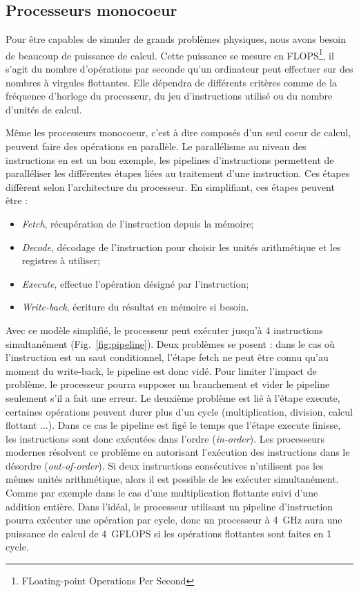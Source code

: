 \subsection{Processeurs monocoeur}
Pour être capables de simuler de grands problèmes physiques, nous avons besoin de beaucoup de puissance de calcul.
%
Cette puissance se mesure en FLOPS\footnote{FLoating-point Operations Per Second}, il s'agit du nombre d'opérations par seconde qu'un ordinateur peut effectuer sur des nombres à virgules flottantes.
%
Elle dépendra de différents critères comme de la fréquence d'horloge du processeur, du jeu d'instructions utilisé ou du nombre d'unités de calcul.


Même les processeurs monocoeur, c'est à dire composés d'un seul coeur de calcul, peuvent faire des opérations en parallèle.
%
Le parallélisme au niveau des instructions en est un bon exemple, les pipelines d'instructions permettent de paralléliser les différentes étapes liées au traitement d'une instruction.
%
Ces étapes diffèrent selon l'architecture du processeur.
%
En simplifiant, ces étapes peuvent être :
\begin{itemize}
  \item {\em Fetch}, récupération de l'instruction depuis la mémoire;
  \item {\em Decode}, décodage de l'instruction pour choisir les unités arithmétique et les registres à utiliser;
  \item {\em Execute}, effectue l'opération désigné par l'instruction;
  \item {\em Write-back}, écriture du résultat en mémoire si besoin.
\end{itemize}
%
Avec ce modèle simplifié, le processeur peut exécuter jusqu'à 4 instructions simultanément (Fig.~\ref{fig:pipeline}).
%
Deux problèmes se posent : dans le cas où l'instruction est un saut conditionnel, l'étape fetch ne peut être connu qu'au moment du write-back, le pipeline est donc vidé.
%
Pour limiter l'impact de problème, le processeur pourra supposer un branchement et vider le pipeline seulement s'il a fait une erreur.
%
Le deuxième problème est lié à l'étape execute, certaines opérations peuvent durer plus d'un cycle (multiplication, division, calcul flottant ...).
%
Dans ce cas le pipeline est figé le temps que l'étape execute finisse, les instructions sont donc exécutées dans l'ordre ({\em in-order}).
%
Les processeurs modernes résolvent ce problème en autorisant l'exécution des instructions dans le désordre ({\em out-of-order}).
%
Si deux instructions consécutives n'utilisent pas les mêmes unités arithmétique, alors il est possible de les exécuter simultanément.
%
Comme par exemple dans le cas d'une multiplication flottante suivi d'une addition entière.
%
Dans l'idéal, le processeur utilisant un pipeline d'instruction pourra exécuter une opération par cycle, donc un processeur à 4~GHz aura une puissance de calcul de 4~GFLOPS si les opérations flottantes sont faites en 1 cycle.



